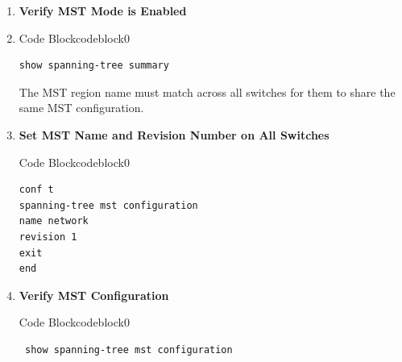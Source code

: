 \documentclass[a4paper]{book}
\begin{document}
\begin{enumerate}
	\item \textbf{Verify MST Mode is Enabled}
	\item


	      \begin{ocg}{Code Block}{codeblock}{0}
		      \vspace{0.5cm}
		      \begin{lstlisting}
show spanning-tree summary
\end{lstlisting}
	      \end{ocg}
	      \vspace{1cm}

	      The MST region name must match across all switches for them to share the same MST configuration.



	\item \textbf{Set MST Name and Revision Number on All Switches}




	      \begin{ocg}{Code Block}{codeblock}{0}
		      \vspace{0.5cm}
		      \begin{lstlisting}
conf t
spanning-tree mst configuration
name network
revision 1
exit
end

\end{lstlisting}
	      \end{ocg}

	\item \textbf{Verify MST Configuration}



	      \begin{ocg}{Code Block}{codeblock}{0}
		      \vspace{0.5cm}
		      \begin{lstlisting}
 show spanning-tree mst configuration
 \end{lstlisting}
	      \end{ocg}



\end{enumerate}
\end{document}
